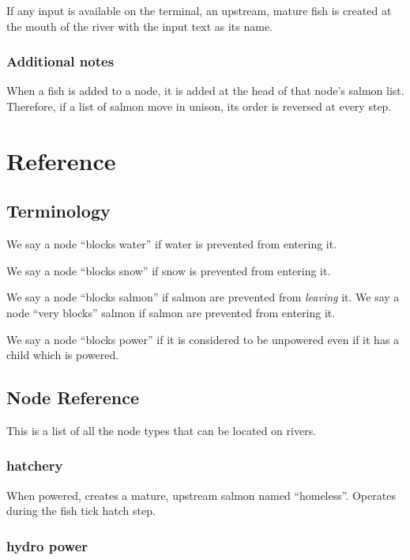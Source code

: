 \documentclass[10pt]{article}
\begin{document}
If any input is available on the terminal, an upstream, mature fish is created at the mouth of the river with the input
text as its name.

\subsubsection{Additional notes}

When a fish is added to a node, it is added at the head of that node's salmon list. Therefore, if a list of salmon move
in unison, its order is reversed at every step.

\section{Reference}

\subsection{Terminology}

We say a node ``blocks water'' if water is prevented from entering it.

We say a node ``blocks snow'' if snow is prevented from entering it.

We say a node ``blocks salmon'' if salmon are prevented from \emph{leaving} it. We say a node ``very blocks''
salmon if salmon are prevented from entering it.

We say a node ``blocks power'' if it is considered to be unpowered even if it has a child which is powered.

\subsection{Node Reference}

\label{sec:nodes}
This is a list of all the node types that can be located on rivers.

\subsubsection{hatchery}

When powered, creates a mature, upstream salmon named ``homeless''. Operates during the
fish tick hatch step.

\subsubsection{hydro power}
\end{document}
